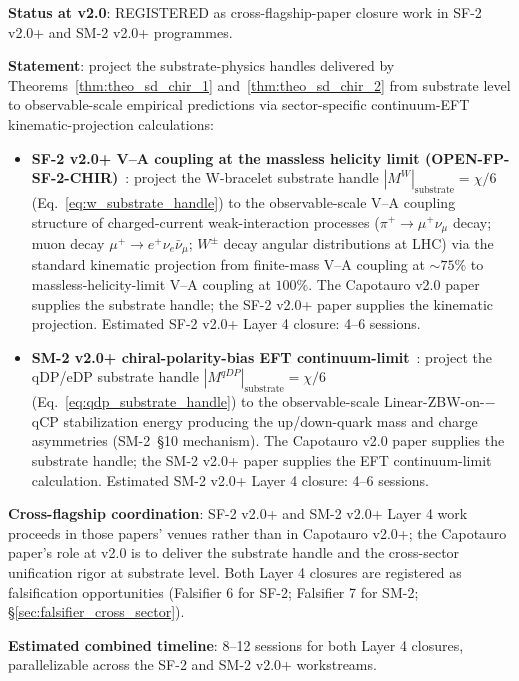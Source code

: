 \documentclass[11pt,letterpaper]{article}
\begin{document}
\textbf{Status at v2.0}: REGISTERED as cross-flagship-paper closure work in SF-2 v2.0+ and SM-2 v2.0+ programmes.

\textbf{Statement}: project the substrate-physics handles delivered by Theorems~\ref{thm:theo_sd_chir_1} and~\ref{thm:theo_sd_chir_2} from substrate level to observable-scale empirical predictions via sector-specific continuum-EFT kinematic-projection calculations:

\begin{itemize}\setlength\itemsep{0.3em}
    \item \textbf{SF-2 v2.0+ V--A coupling at the massless helicity limit (OPEN-FP-SF-2-CHIR)}~\cite{abshier_sf2,abshier_research_frontier}: project the W-bracelet substrate handle $|M^W|_{\text{substrate}} = \chi/6$ (Eq.~\eqref{eq:w_substrate_handle}) to the observable-scale V--A coupling structure of charged-current weak-interaction processes ($\pi^+ \to \mu^+ \nu_\mu$ decay; muon decay $\mu^+ \to e^+ \nu_e \bar{\nu}_\mu$; $W^\pm$ decay angular distributions at LHC) via the standard kinematic projection from finite-mass V--A coupling at $\sim 75\%$ to massless-helicity-limit V--A coupling at $100\%$. The Capotauro v2.0 paper supplies the substrate handle; the SF-2 v2.0+ paper supplies the kinematic projection. Estimated SF-2 v2.0+ Layer 4 closure: 4--6 sessions.
    \item \textbf{SM-2 v2.0+ chiral-polarity-bias EFT continuum-limit}~\cite{abshier_sm2,abshier_research_frontier}: project the qDP/eDP substrate handle $|M^{qDP}|_{\text{substrate}} = \chi/6$ (Eq.~\eqref{eq:qdp_substrate_handle}) to the observable-scale Linear-ZBW-on-$-$qCP stabilization energy producing the up/down-quark mass and charge asymmetries (SM-2~\S10 mechanism). The Capotauro v2.0 paper supplies the substrate handle; the SM-2 v2.0+ paper supplies the EFT continuum-limit calculation. Estimated SM-2 v2.0+ Layer 4 closure: 4--6 sessions.
\end{itemize}

\textbf{Cross-flagship coordination}: SF-2 v2.0+ and SM-2 v2.0+ Layer 4 work proceeds in those papers' venues rather than in Capotauro v2.0+; the Capotauro paper's role at v2.0 is to deliver the substrate handle and the cross-sector unification rigor at substrate level. Both Layer 4 closures are registered as falsification opportunities (Falsifier 6 for SF-2; Falsifier 7 for SM-2; \S\ref{sec:falsifier_cross_sector}).

\textbf{Estimated combined timeline}: 8--12 sessions for both Layer 4 closures, parallelizable across the SF-2 and SM-2 v2.0+ workstreams.
\end{document}
